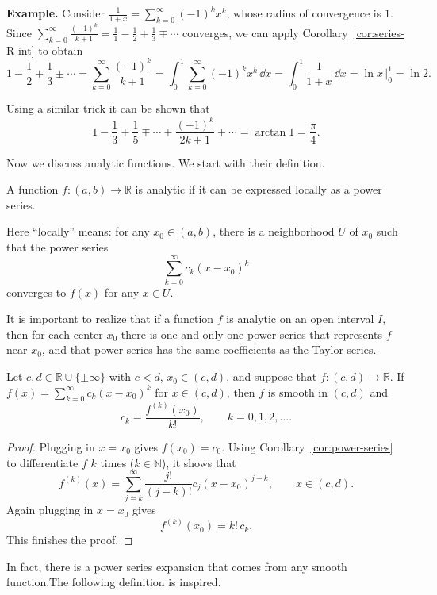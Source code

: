 \documentclass[11pt]{article}
\begin{document}
\noindent\textbf{Example.} Consider $\displaystyle \frac{1}{1 + x} = \sum_{k=0}^\infty (-1)^k x^k$, whose radius of convergence is $1$.
Since $\displaystyle \sum_{k=0}^\infty \frac{(-1)^k}{k+1} = \frac11 - \frac12 + \frac13 \mp \cdots$ converges, we can apply Corollary~\ref{cor:series-R-int} to obtain
\[
  1 - \frac12 + \frac13 \pm \cdots = \sum_{k=0}^\infty \frac{(-1)^k}{k+1}
  = \int_0^1 \sum_{k=0}^\infty (-1)^k x^k \, \dd x 
  = \int_0^1 \frac{1}{1+x} \, \dd x
  = \ln x \, \Big|_0^1 = \ln 2. 
\]

Using a similar trick it can be shown that
\[
  1 - \frac13 + \frac15 \mp \cdots + \frac{(-1)^k}{2k+1} + \cdots = \arctan 1 = \frac{\pi}{4}.
\]

Now we discuss analytic functions.
We start with their definition.

\begin{defn}
  A function $f : (a,b) \to \mathbb{R}$ is \textsf{analytic} if it can be expressed locally as a power series.
\end{defn}

Here ``locally'' means: for any $x_0 \in (a,b)$, there is a neighborhood $U$ of $x_0$ such that the power series
\[
  \sum_{k=0}^\infty c_k (x - x_0)^k
\]
converges to $f(x)$ for any $x \in U$.

It is important to realize that if a function $f$ is analytic on an open interval $I$, then for each center $x_0$ there is one and only one power series that represents $f$ near $x_0$, and that power series has the same coefficients as the Taylor series.

\begin{thm}
  Let $c, d \in \mathbb{R} \cup \{ \pm \infty \}$ with $c < d$, $x_0 \in (c,d)$, and suppose that $f : (c, d) \to \mathbb{R}$.
  If $f(x) = \displaystyle \sum_{k=0}^\infty c_k (x - x_0)^k$ for $x \in (c,d)$, then $f$ is smooth in $(c,d)$ and
  \[
    c_k = \frac{ f^{(k)}(x_0) }{k!}, \qquad k = 0, 1, 2, \dots.
  \]
\end{thm}

\begin{proof}
  Plugging in $x = x_0$ gives $f(x_0) = c_0$.
  Using Corollary~\ref{cor:power-series} to differentiate $f$ $k$ times ($k \in \mathbb{N}$), it shows that
  \[
    f^{(k)}(x) = \sum_{j=k}^\infty \frac{j!}{(j-k)!} c_j (x-x_0)^{j-k}, \qquad x \in (c,d).
  \]
  Again plugging in $x = x_0$ gives
  \[
    f^{(k)}(x_0) = k! \, c_k.
  \]
  This finishes the proof.
\end{proof}

In fact, there is a power series expansion that comes from any smooth function.The following definition is inspired.
\end{document}
